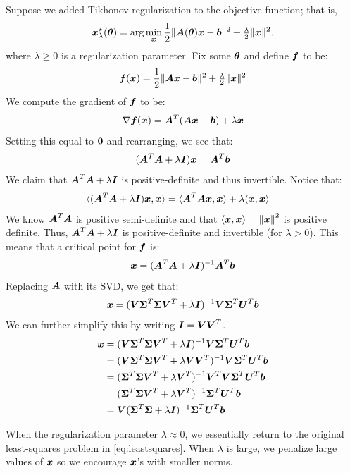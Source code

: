 Suppose we added Tikhonov regularization to the objective function; that is,
            \begin{align}
                \boldsymbol{x}_{\lambda}^\star(\boldsymbol{\theta}) = \arg\min_{\boldsymbol{x}} \frac{1}{2}\|\boldsymbol{A}(\boldsymbol{\theta}) \boldsymbol{x} - \boldsymbol{b}\|^2 + \tfrac{\lambda}{2}\|\boldsymbol{x}\|^2.
            \end{align}
        where $\lambda \ge 0$ is a regularization parameter. Fix some $\boldsymbol{\theta}$ and define $\boldsymbol{f}$ to be:
        \[
        \boldsymbol{f}(\boldsymbol{x})=\frac{1}{2}\|\boldsymbol{A} \boldsymbol{x} - \boldsymbol{b}\|^2 + \tfrac{\lambda}{2}\|\boldsymbol{x}\|^2
        \]
        We compute the gradient of $\boldsymbol{f}$ to be:
        \[
        \nabla\boldsymbol{f}(\boldsymbol{x})=\boldsymbol{A}^T(\boldsymbol{A}\boldsymbol{x}-\boldsymbol{b})+\lambda\boldsymbol{x}
        \]
        Setting this equal to $\boldsymbol{0}$ and rearranging, we see that:
        \[
        (\boldsymbol{A}^T\boldsymbol{A}+\lambda \boldsymbol{I})\boldsymbol{x}=\boldsymbol{A}^T\boldsymbol{b}
        \]
        We claim that $\boldsymbol{A}^T\boldsymbol{A}+\lambda \boldsymbol{I}$ is positive-definite and thus invertible. Notice that:
        \begin{align*}
            \langle(\boldsymbol{A}^T\boldsymbol{A}+\lambda\boldsymbol{I})\boldsymbol{x},\boldsymbol{x}\rangle&=\langle\boldsymbol{A}^T\boldsymbol{A}\boldsymbol{x},\boldsymbol{x}\rangle+\lambda\langle\boldsymbol{x},\boldsymbol{x}\rangle
        \end{align*}
        We know $\boldsymbol{A}^T\boldsymbol{A}$ is positive semi-definite and that $\langle\boldsymbol{x},\boldsymbol{x}\rangle=\left\Vert\boldsymbol{x}\right\Vert^2$ is positive definite. Thus, $\boldsymbol{A}^T\boldsymbol{A}+\lambda \boldsymbol{I}$ is positive-definite and invertible (for $\lambda>0$). This means that a critical point for $\boldsymbol{f}$ is:
        \[
        \boldsymbol{x}=(\boldsymbol{A}^T\boldsymbol{A}+\lambda\boldsymbol{I})^{-1}\boldsymbol{A}^T\boldsymbol{b}
        \]
        Replacing $\boldsymbol{A}$ with its SVD, we get that:
        \[
        \boldsymbol{x}=(\boldsymbol{V}\boldsymbol{\Sigma}^T\boldsymbol{\Sigma}\boldsymbol{V}^T+\lambda\boldsymbol{I})^{-1}\boldsymbol{V}\boldsymbol{\Sigma}^T\boldsymbol{U}^T\boldsymbol{b}
        \]
        We can further simplify this by writing $\boldsymbol{I}=\boldsymbol{V}\boldsymbol{V}^T$.
        \begin{align*}
            \boldsymbol{x}&=(\boldsymbol{V}\boldsymbol{\Sigma}^T\boldsymbol{\Sigma}\boldsymbol{V}^T+\lambda\boldsymbol{I})^{-1}\boldsymbol{V}\boldsymbol{\Sigma}^T\boldsymbol{U}^T\boldsymbol{b}\\
            &=(\boldsymbol{V}\boldsymbol{\Sigma}^T\boldsymbol{\Sigma}\boldsymbol{V}^T+\lambda\boldsymbol{V}\boldsymbol{V}^T)^{-1}\boldsymbol{V}\boldsymbol{\Sigma}^T\boldsymbol{U}^T\boldsymbol{b}\\
            &=(\boldsymbol{\Sigma}^T\boldsymbol{\Sigma}\boldsymbol{V}^T+\lambda\boldsymbol{V}^T)^{-1}\boldsymbol{V}^T\boldsymbol{V}\boldsymbol{\Sigma}^T\boldsymbol{U}^T\boldsymbol{b}\\
            &=(\boldsymbol{\Sigma}^T\boldsymbol{\Sigma}\boldsymbol{V}^T+\lambda\boldsymbol{V}^T)^{-1}\boldsymbol{\Sigma}^T\boldsymbol{U}^T\boldsymbol{b}\\
            &=\boldsymbol{V}(\boldsymbol{\Sigma}^T\boldsymbol{\Sigma}+\lambda\boldsymbol{I})^{-1}\boldsymbol{\Sigma}^T\boldsymbol{U}^T\boldsymbol{b}
        \end{align*}
        
        When the regularization parameter $\lambda\approx 0$, we essentially return to the original least-squares problem in \ref{eq:leastsquares}. When $\lambda$ is large, we penalize large values of $\boldsymbol{x}$ so we encourage $\boldsymbol{x}$'s with smaller norms.


